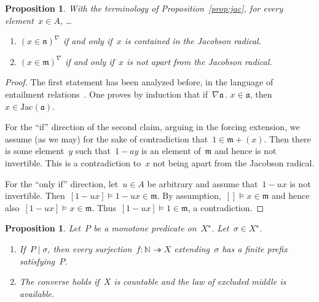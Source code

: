 \documentclass[com,11pt,crcready]{iosart2x}
\theoremstyle{definition}
\theoremstyle{plain}
\newtheorem{proposition}[definition]{Proposition}
\theoremstyle{remark}
\newcommand{\aaa}{\mathfrak{a}}
\newcommand{\mmm}{\mathfrak{m}}
\newcommand{\nnn}{\mathfrak{n}}
\newcommand{\NN}{\mathbb{N}}
\renewcommand{\_}{\mathpunct{.}\,}
\begin{document}
\begin{proposition}\label{prop:mmm-nnn}With the terminology of Proposition~\ref{prop:jac}, for
every element~$x \in A$, \ldots \begin{enumerate}
\item $(x \in \nnn)^\nabla$ if and only if~$x$ is contained in the Jacobson
radical.
\item $(x \in \mmm)^\nabla$ if and only if~$x$ is not apart from the Jacobson
radical.
\end{enumerate}
\end{proposition}

\begin{proof}The first statement has been analyzed before, in the language of
entailment relations~\cite[Corollary~2]{schuster-wessel:krull}. One proves by
induction that if~$\nabla\aaa\_ x \in \aaa$, then~$x \in \mathrm{Jac}(\aaa)$.

For the ``if'' direction of the second claim, arguing in the forcing extension,
we assume (as we may) for the sake of contradiction that~$1 \in \mmm + (x)$.
Then there is some element~$y$ such that~$1 - ay$ is an element of~$\mmm$ and
hence is not invertible. This is a contradiction to~$x$ not being apart from
the Jacobson radical.

For the ``only if'' direction, let~$u \in A$ be arbitrary and assume that~$1 -
ux$ is not invertible. Then~$[1-ux] \models 1-ux \in \mmm$. By assumption,~$[]
\models x \in \mmm$ and hence also~$[1-ux] \models x \in \mmm$. Thus~$[1-ux]
\models 1 \in \mmm$, a contradiction.
\end{proof}

\color{gray}

\begin{proposition}Let~$P$ be a monotone predicate on~$X^\star$. Let~$\sigma
\in X^\star$.
\begin{enumerate}
\item[\textnormal{(a)}] If~$P \mid \sigma$, then every surjection~$f : \NN
\twoheadrightarrow X$
extending~$\sigma$ has a finite prefix satisfying~$P$.
\item[\textnormal{(b)}] The converse holds if~$X$ is countable and the law of excluded middle
is available.
\end{enumerate}
\end{proposition}
\end{document}
